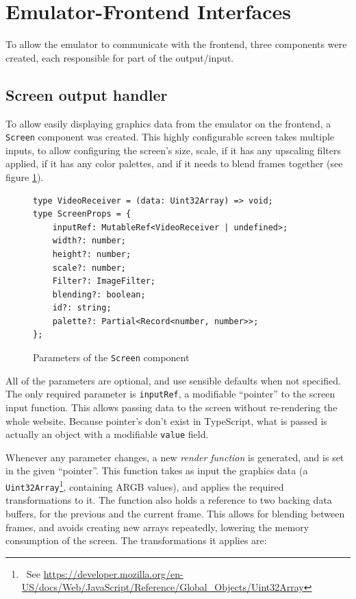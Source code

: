\documentclass[11pt]{informatics-report}
\newcommand{\ftnt}[1]{\footnote{~See \url{#1}}}
\begin{document}
\section{Emulator-Frontend Interfaces}

To allow the emulator to communicate with the frontend, three components were created, each responsible for part of the output/input. 

\subsection{Screen output handler}

To allow easily displaying graphics data from the emulator on the frontend, a \texttt{Screen} component was created. This highly configurable screen takes multiple inputs, to allow configuring the screen's size, scale, if it has any upscaling filters applied, if it has any color palettes, and if it needs to blend frames together (see figure \ref{fig:screen-params}).

\begin{figure}[h]
    \begin{verbatim}
type VideoReceiver = (data: Uint32Array) => void;
type ScreenProps = {
    inputRef: MutableRef<VideoReceiver | undefined>;
    width?: number;
    height?: number;
    scale?: number;
    Filter?: ImageFilter;
    blending?: boolean;
    id?: string;
    palette?: Partial<Record<number, number>>;
};
    \end{verbatim}
    \caption{Parameters of the \texttt{Screen} component}
    \label{fig:screen-params}
\end{figure}

All of the parameters are optional, and use sensible defaults when not specified. The only required parameter is \texttt{inputRef}, a modifiable ``pointer'' to the screen input function. This allows passing data to the screen without re-rendering the whole website. Because pointer's don't exist in TypeScript, what is passed is actually an object with a modifiable \texttt{value} field.

Whenever any parameter changes, a new \textit{render function} is generated, and is set in the given ``pointer''. This function takes as input the graphics data (a \texttt{Uint32Array}\ftnt{https://developer.mozilla.org/en-US/docs/Web/JavaScript/Reference/Global_Objects/Uint32Array}, containing ARGB values), and applies the required transformations to it. The function also holds a reference to two backing data buffers, for the previous and the current frame. This allows for blending between frames, and avoids creating new arrays repeatedly, lowering the memory consumption of the screen. The transformations it applies are: 
\end{document}
